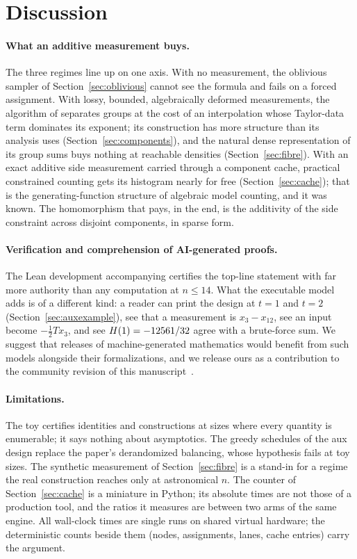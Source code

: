 \documentclass[11pt]{article}
\theoremstyle{definition}
\theoremstyle{remark}
\begin{document}
\section{Discussion}\label{sec:discussion}

\paragraph{What an additive measurement buys.} The three regimes line up on one axis. With no measurement, the oblivious sampler of Section~\ref{sec:oblivious} cannot see the formula and fails on a forced assignment. With lossy, bounded, algebraically deformed measurements, the algorithm of \citet{OpenAI26} separates groups at the cost of an interpolation whose Taylor-data term dominates its exponent; its construction has more structure than its analysis uses (Section~\ref{sec:components}), and the natural dense representation of its group sums buys nothing at reachable densities (Section~\ref{sec:fibre}). With an exact additive side measurement carried through a component cache, practical constrained counting gets its histogram nearly for free (Section~\ref{sec:cache}); that is the generating-function structure of algebraic model counting, and it was known. The homomorphism that pays, in the end, is the additivity of the side constraint across disjoint components, in sparse form.

\paragraph{Verification and comprehension of AI-generated proofs.} The Lean development accompanying \citet{OpenAI26} certifies the top-line statement with far more authority than any computation at $n \le 14$. What the executable model adds is of a different kind: a reader can print the design at $t = 1$ and $t = 2$ (Section~\ref{sec:auxexample}), see that a measurement is $x_3 - x_{12}$, see an input become $-\tfrac12 T x_3$, and see $H(1) = -12561/32$ agree with a brute-force sum. We suggest that releases of machine-generated mathematics would benefit from such models alongside their formalizations, and we release ours as a contribution to the community revision of this manuscript~\citep{OAIrepo}.

\paragraph{Limitations.} The toy certifies identities and constructions at sizes where every quantity is enumerable; it says nothing about asymptotics. The greedy schedules of the aux design replace the paper's derandomized balancing, whose hypothesis fails at toy sizes. The synthetic measurement of Section~\ref{sec:fibre} is a stand-in for a regime the real construction reaches only at astronomical $n$. The counter of Section~\ref{sec:cache} is a miniature in Python; its absolute times are not those of a production tool, and the ratios it measures are between two arms of the same engine. All wall-clock times are single runs on shared virtual hardware; the deterministic counts beside them (nodes, assignments, lanes, cache entries) carry the argument.
\end{document}
